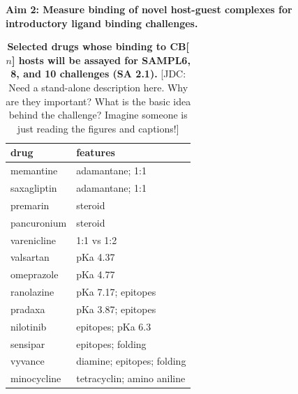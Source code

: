 \documentclass[11pt]{article}
\begin{document}
\textbf{Aim 2: Measure binding of novel host-guest complexes for introductory ligand binding challenges.}

\begin{table}
\footnotesize
\begin{tabular}{l | l}
{\bf drug} & {\bf features} \\
\hline
memantine & adamantane; 1:1 \\
saxagliptin & adamantane; 1:1 \\
premarin & steroid \\
pancuronium & steroid\\
varenicline & 1:1 vs 1:2 \\
valsartan & pKa 4.37 \\ 
omeprazole & pKa 4.77 \\
ranolazine & pKa 7.17; epitopes \\
pradaxa & pKa 3.87; epitopes \\
nilotinib & epitopes; pKa 6.3 \\
sensipar & epitopes; folding \\
vyvance & diamine; epitopes; folding \\
minocycline & tetracyclin; amino aniline \\
\end{tabular}
\caption{\label{table:CB} {\bf Selected drugs whose binding to CB[$n$] hosts will be assayed for SAMPL6, 8, and 10 challenges (SA 2.1).} 
{\color{red}[JDC: Need a stand-alone description here. Why are they important? What is the basic idea behind the challenge? Imagine someone is just reading the figures and captions!]}
}
\end{table}
\end{document}
